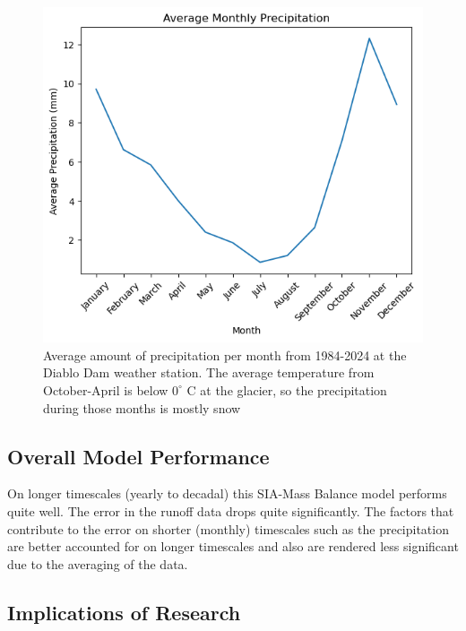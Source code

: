\documentclass{article}
\begin{document}
\begin{figure}[h!]
    \centering
    \includegraphics[width=\textwidth]{Plots/monthly_precip.png}
    \caption{Average amount of precipitation per month from 1984-2024 at the Diablo Dam weather station. The average temperature from October-April is below $0^\circ$ C at the glacier, so the precipitation during those months is mostly snow}
    \label{fig:monthly_precip}
\end{figure}    
\FloatBarrier
\subsection{Overall Model Performance}
On longer timescales (yearly to decadal) this SIA-Mass Balance model performs quite well. The error in the runoff data drops quite significantly. 
The factors that contribute to the error on shorter (monthly) timescales such as the precipitation are better accounted for on longer timescales 
and also are rendered less significant due to the averaging of the data.
\subsection{Implications of Research}
\end{document}
